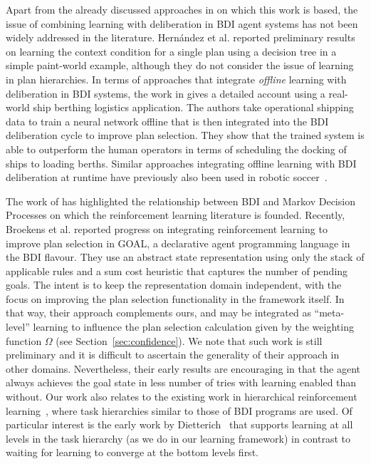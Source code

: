 Apart from the already discussed approaches in \cite{airiau09:enhancing,singh10:extending,singh10:learning} on which this work is based, the issue of combining learning with deliberation in BDI agent systems has not been widely addressed in the literature. 
%
Hern\'andez et al. \cite{hernandez04:learning} reported preliminary results on learning the context condition for a single plan using a decision tree in a simple paint-world example, although they do not consider the issue of learning in plan hierarchies. In terms of approaches that integrate \emph{offline} learning with deliberation in BDI systems, the work in \cite{lokuge07:improving} gives a detailed account using a real-world ship berthing logistics application. The authors take operational shipping data to train a neural network offline that is then integrated into the BDI deliberation cycle to improve plan selection. They show that the trained system is able to outperform the human operators in terms of scheduling the docking of ships to loading berths. Similar approaches integrating offline learning with BDI deliberation at runtime have previously also been used in robotic soccer~\cite{riedmiller01:karlsruhe,brusey02:learning}.

The work of \cite{simari06:relationship} has highlighted the relationship between BDI and Markov Decision Processes on which the reinforcement learning literature is founded. 
%
Recently, Broekens et al. \cite{broekens10:reinforcement} reported progress on integrating reinforcement learning to improve plan selection in GOAL, a declarative agent programming language in the BDI flavour. They use an abstract state representation using only the stack of applicable rules and a sum cost heuristic that captures the number of pending goals. The intent is to keep the representation domain independent, with the focus on improving the plan selection functionality in the framework itself. In that way, their approach complements ours, and may be integrated as ``meta-level'' learning to influence the plan selection calculation given by the weighting function $\Omega$ (see Section~\ref{sec:confidence}). We note that such work is still preliminary and it is difficult to ascertain the generality of their approach in other domains. Nevertheless, their early results are encouraging in that the agent always achieves the goal state in less number of tries with learning enabled than without.
%
Our work also relates to the existing work in hierarchical reinforcement learning~\cite{barto03:recent}, where task hierarchies similar to those of BDI programs are used. Of particular interest is the early work by Dietterich~\cite{dietterich00:hierarchical} that supports learning at all levels in the task hierarchy (as we do in our learning framework) in contrast to waiting for learning to converge at the bottom levels first.

